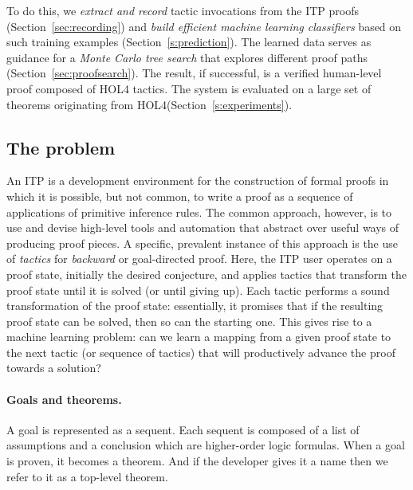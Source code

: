 \documentclass[runningheads,a4paper,draft]{svjour3}
\newcommand{\todoi}[1]{\todo[inline]{#1}}
\def\holfour{\textsf{HOL4}\xspace}
\begin{document}
\todoi{Rewrite the plan}
  To do this, we \emph{extract and record} tactic invocations from the ITP
  proofs (Section~\ref{sec:recording}) and
  \emph{build efficient machine learning classifiers} based on such training
  examples (Section~\ref{s:prediction}).  The learned data serves as
  guidance for a \emph{Monte Carlo tree search} that explores different
  proof paths (Section~\ref{sec:proofsearch}). The result, if
  successful, is a verified human-level proof composed of \holfour
  tactics.  The system is evaluated on a large set of theorems originating
  from \holfour (Section~\ref{s:experiments}).


\subsection{The problem}
An ITP is a development environment for the construction of formal proofs in which it is possible, but not common, to write a proof as a sequence of applications of primitive inference rules.
The common approach, however, is to use and devise high-level tools and automation that abstract over useful ways of producing proof pieces.
A specific, prevalent instance of this approach is the use of \emph{tactics} for \emph{backward} or goal-directed proof.
Here, the ITP user operates on a proof state, initially the desired conjecture, and applies tactics that transform the proof state until it is solved (or until giving up).
Each tactic performs a sound transformation of the proof state: essentially, it promises that if the resulting proof state can be solved, then so can the starting one.
This gives rise to a machine learning problem: can we learn a mapping from a given proof state to the next tactic (or sequence of tactics) that will productively advance the proof towards a solution?

\paragraph{Goals and theorems.}
A goal is represented as a sequent. Each sequent is composed of
a list of assumptions and a conclusion which are higher-order logic formulas.
When a goal is proven, it becomes a theorem. And if the developer gives it a
name then we refer to it as a top-level theorem.
\end{document}
